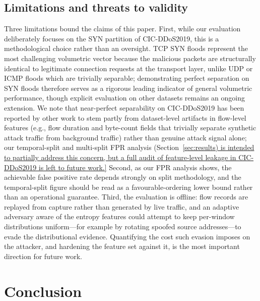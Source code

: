 \documentclass{ieeeaccess}
\begin{document}
\subsection{Limitations and threats to validity}
Three limitations bound the claims of this paper. First, while our evaluation deliberately focuses on the SYN partition of CIC-DDoS2019, this is a methodological choice rather than an oversight. TCP SYN floods represent the most challenging volumetric vector because the malicious packets are structurally identical to legitimate connection requests at the transport layer, unlike UDP or ICMP floods which are trivially separable; demonstrating perfect separation on SYN floods therefore serves as a rigorous leading indicator of general volumetric performance, though explicit evaluation on other datasets remains an ongoing extension. We note that near-perfect separability on CIC-DDoS2019 has been reported by other work to stem partly from dataset-level artifacts in flow-level features (e.g., flow duration and byte-count fields that trivially separate synthetic attack traffic from background traffic) rather than genuine attack signal alone; our temporal-split and multi-split FPR analysis (Section~\ref{sec:results) is intended to partially address this concern, but a full audit of feature-level leakage in CIC-DDoS2019 is left to future work.} Second, as our FPR analysis shows, the achievable false positive rate depends strongly on split methodology, and the temporal-split figure should be read as a favourable-ordering lower bound rather than an operational guarantee. Third, the evaluation is offline: flow records are replayed from capture rather than generated by live traffic, and an adaptive adversary aware of the entropy features could attempt to keep per-window distributions uniform---for example by rotating spoofed source addresses---to evade the distributional evidence. Quantifying the cost such evasion imposes on the attacker, and hardening the feature set against it, is the most important direction for future work.

\section{Conclusion}
\label{sec:conclusion}
\end{document}
